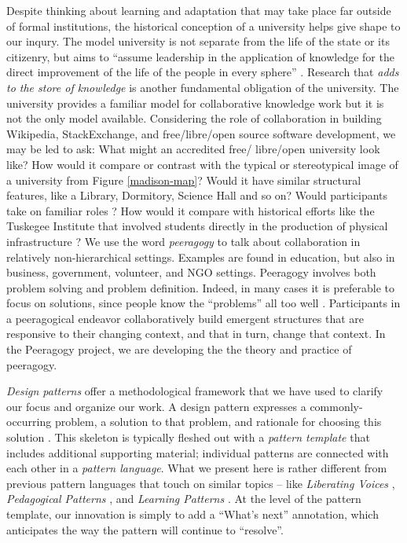 \begin{refsection}
Despite thinking about learning and adaptation that
may take place far outside of formal institutions, the historical
conception of a university helps give shape to our inqury.
%
The model university is not separate from the life of the state or its
citizenry, but aims to ``assume leadership in the application of
knowledge for the direct improvement of the life of the people in
every sphere'' \cite[p.~88]{curti1949university}. Research that
\emph{adds to the store of knowledge} is another fundamental
obligation of the university.
The university provides a familiar model for collaborative knowledge work
but it is not the only model available.
Considering the role of collaboration in building Wikipedia,
StackExchange, and free\slash libre\slash open source software
development, we may be led to ask:  What might an accredited free\slash
libre\slash open university look like?  How would it compare or
contrast with the typical or stereotypical image of a university from
Figure \ref{madison-map}?  Would it have similar structural features, like a Library,
Dormitory, Science Hall and so on?  Would participants take
on familiar roles \cite{corneli+crowdsourcing}?  How would it compare
with historical efforts like the Tuskegee Institute that involved
students directly in the production of physical infrastructure
\cite{washington1986up}?
%
We use the word \emph{peeragogy} to talk about collaboration in
relatively non-hierarchical settings.  Examples are found in
education, but also in business, government, volunteer, and NGO
settings.  Peeragogy involves both problem solving and problem
definition.  Indeed, in many cases it is preferable to focus on
solutions, since people know the ``problems'' all too well
\cite{ariyaratneXorganizationX1977}.  Participants in a peeragogical
endeavor collaboratively build emergent structures that are responsive
to their changing context, and that in turn, change that context. In
the Peeragogy project, we are developing the the theory and practice
of peeragogy.

\emph{Design patterns} offer a methodological framework that we have
used to clarify our focus and organize our work.  A design pattern
expresses a commonly-occurring problem, a solution to that problem,
and rationale for choosing this solution \cite{meszaros1998pattern}.
This skeleton is typically fleshed out with a \emph{pattern template}
that includes additional supporting material; individual patterns are
connected with each other in a \emph{pattern language}.  What we
present here is rather different from previous pattern languages that touch
on similar topics -- like \emph{Liberating Voices}
\cite{schuler2008liberating}, \emph{Pedagogical Patterns}
\cite{bergin2012pedagogical}, and \emph{Learning Patterns}
\cite{iba2014learning}.  At the level of the pattern template, our
innovation is simply to add a ``What's next'' annotation, which
anticipates the way the pattern will continue to ``resolve''.


\end{refsection}
